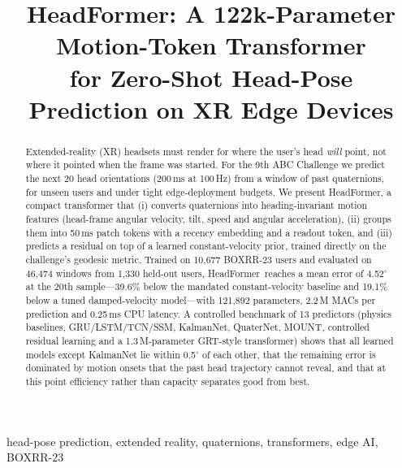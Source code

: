 \documentclass[conference]{IEEEtran}
\newcommand{\todo}[1]{\textcolor{red}{[TODO: #1]}}
\newcommand{\ours}{HeadFormer}   %
\begin{document}
\title{\ours: A 122k-Parameter Motion-Token Transformer\\for Zero-Shot Head-Pose Prediction on XR Edge Devices}

\author{
\IEEEauthorblockN{\todo{Author 1}, \todo{Author 2}, \todo{Author 3} \todo{(all team members)}}
\IEEEauthorblockA{\todo{Affiliation}\\
\todo{Team name: TEAMNAME} \quad \todo{e-mail}}
}

\maketitle

\begin{abstract}
Extended-reality (XR) headsets must render for where the user's head \emph{will} point, not where it pointed when the frame
was started. For the 9th ABC Challenge we predict the next 20 head orientations (200\,ms at 100\,Hz) from a window of past
quaternions, for unseen users and under tight edge-deployment budgets. We present \ours, a compact transformer that
(i) converts quaternions into heading-invariant motion features (head-frame angular velocity, tilt, speed and angular
acceleration), (ii) groups them into 50\,ms patch tokens with a recency embedding and a readout token, and (iii) predicts a
residual on top of a learned constant-velocity prior, trained directly on the challenge's geodesic metric. Trained on
10{,}677 BOXRR-23 users and evaluated on 46{,}474 windows from 1{,}330 held-out users, \ours\ reaches a mean error of
4.52$^\circ$ at the 20th sample---39.6\% below the mandated constant-velocity baseline and 19.1\% below a tuned
damped-velocity model---with 121{,}892 parameters, 2.2\,M MACs per prediction and 0.25\,ms CPU latency. A controlled
benchmark of 13 predictors (physics baselines, GRU/LSTM/TCN/SSM, KalmanNet, QuaterNet, MOUNT, controlled residual learning
and a 1.3\,M-parameter GRT-style transformer) shows that all learned models except KalmanNet lie within 0.5$^\circ$ of each other, that
the remaining error is dominated by motion onsets that the past head trajectory cannot reveal, and that at this point
efficiency rather than capacity separates good from best.
\end{abstract}

\begin{IEEEkeywords}
head-pose prediction, extended reality, quaternions, transformers, edge AI, BOXRR-23
\end{IEEEkeywords}

\end{document}
